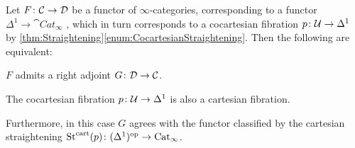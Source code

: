 \begin{lem}\label{lem:AdjunctionBicartesian}
	Let $F\colon \mathcal{C}\rightarrow \mathcal{D}$ be a functor of $\infty$-categories, corresponding to a functor $\Delta^1\rightarrow \cat{Cat}_\infty$ , which in turn corresponds to a cocartesian fibration $p\colon \mathcal{U}\rightarrow \Delta^1$ by \cref{thm:Straightening}\cref{enum:CocartesianStraightening}. Then the following are equivalent:
	\begin{alphanumerate}
		\item $F$ admits a right adjoint $G\colon \mathcal{D}\rightarrow \mathcal{C}$.\label{enum:BicartesianAdjoint}
		\item \!The cocartesian fibration $p\colon \mathcal{U}\rightarrow \Delta^1$ is also a cartesian fibration.\label{enum:Bicartesian}
	\end{alphanumerate}
	Furthermore, in this case $G$ agrees with the functor classified by the cartesian straightening $\operatorname{St}^{\mathrm{cart}}(p)\colon (\Delta^1)^{\mathrm{op}}\rightarrow \mathrm{Cat}_\infty$.
\end{lem}
